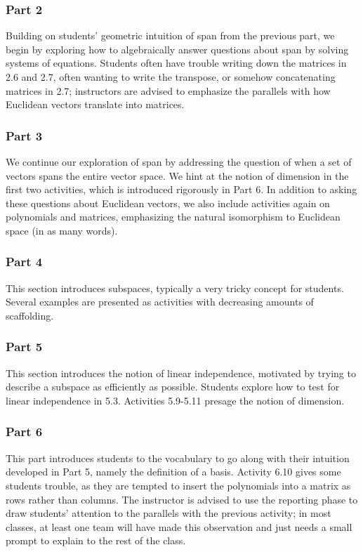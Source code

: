 \documentclass{article}
\begin{document}
\subsubsection*{Part 2}
Building on students' geometric intuition of span from the previous part, we begin by exploring how to algebraically answer questions about span by solving systems of equations.  Students often have trouble writing down the matrices in 2.6 and 2.7, often wanting to write the transpose, or somehow concatenating matrices in 2.7; instructors are advised to emphasize the parallels with how Euclidean vectors translate into matrices.

\subsubsection*{Part 3}
We continue our exploration of span by addressing the question of when a set of vectors spans the entire vector space.  We hint at the notion of dimension in the first two activities, which is introduced rigorously in Part 6.  In addition to asking these questions about Euclidean vectors, we also include activities again on polynomials and matrices, emphasizing the natural isomorphism to Euclidean space (in as many words).  

\subsubsection*{Part 4}
This section introduces subspaces, typically a very tricky concept for students.  Several examples are presented as activities with decreasing amounts of scaffolding.

\subsubsection*{Part 5}
This section introduces the notion of linear independence, motivated by trying to describe a subspace as efficiently as possible.  Students explore how to test for linear independence in 5.3.  Activities 5.9-5.11 presage the notion of dimension.  

\subsubsection*{Part 6}
This part introduces students to the vocabulary to go along with their intuition developed in Part 5, namely the definition of a basis.  Activity 6.10 gives some students trouble, as they are tempted to insert the polynomials into a matrix as rows rather than columns.  The instructor is advised to use the reporting phase to draw students' attention to the parallels with the previous activity; in most classes, at least one team will have made this observation and just needs a small prompt to explain to the rest of the class.  
\end{document}
